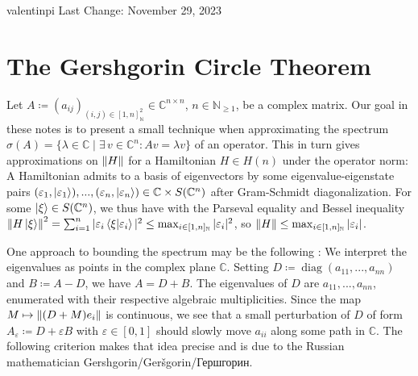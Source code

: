 \documentclass[10pt]{amsart}
\theoremstyle{definition}
\theoremstyle{remark}
\DeclareMathOperator{\diag}{diag}
\begin{document}
    valentinpi \hfill Last Change: November 29, 2023

    \section*{The Gershgorin Circle Theorem}

    Let \(A \coloneqq (a_{ij})_{(i, j) \in [1, n]_{\mathbb{N}}^2} \in \mathbb{C}^{n \times n}\), \(n \in \mathbb{N}_{\geq 1}\), be a complex matrix. Our goal in these notes is to present a small technique when approximating the spectrum \(\sigma(A) = \{\lambda \in \mathbb{C} \mid \exists \, v \in \mathbb{C}^n\colon A v = \lambda v\}\) of an operator. This in turn gives approximations on \(\norm{H}\) for a Hamiltonian \(H \in H(n)\) under the operator norm: A Hamiltonian admits to a basis of eigenvectors by some eigenvalue-eigenstate pairs \((\varepsilon_1, \ket{\varepsilon_1}), ..., (\varepsilon_n, \ket{\varepsilon_n}) \in \mathbb{C} \times S(\mathbb{C}^n)\) after Gram-Schmidt diagonalization. For some \(\ket{\xi} \in S(\mathbb{C}^n)\), we thus have with the Parseval equality and Bessel inequality \(\norm{H\ket{\xi}}^2 = \sum_{i=1}^n |\varepsilon_i \braket{\xi}{\varepsilon_i}|^2 \leq \max_{i \in [1, n]_{\mathbb{N}}} |\varepsilon_i|^2\), so \(\norm{H} \leq \max_{i \in [1, n]_{\mathbb{N}}} |\varepsilon_i|\).

    One approach to bounding the spectrum may be the following \cite[pp. 387-388]{Horn}: We interpret the eigenvalues as points in the complex plane \(\mathbb{C}\). Setting \(D \coloneqq \diag(a_{11}, ..., a_{nn})\) and \(B \coloneqq A-D\), we have \(A = D + B\). The eigenvalues of \(D\) are \(a_{11}, ..., a_{nn}\), enumerated with their respective algebraic multiplicities. Since the map \(M \mapsto \norm{(D + M)e_i}\) is continuous, we see that a small perturbation of \(D\) of form \(A_\varepsilon \coloneqq D + \varepsilon B\) with \(\varepsilon \in [0, 1]\) should slowly move \(a_{ii}\) along some path in \(\mathbb{C}\). The following criterion makes that idea precise and is due to the Russian mathematician Gershgorin/Geršgorin/Гершгорин.
\end{document}
